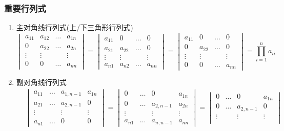 \subsubsection{重要行列式}
\begin{enumerate}
\item 主对角线行列式(上/下三角形行列式)
\begin{equation*}
\begin{vmatrix}
a_{11} & a_{12} & \dots & a_{1n} \\
0 & a_{22} & \dots & a_{2n} \\
\vdots & \vdots & & \vdots \\
0 & 0 & \dots & a_{nn}
\end{vmatrix}=
\begin{vmatrix}
a_{11} & 0 & \dots & 0 \\
a_{21} & a_{22} & \dots & 0 \\
\vdots & \vdots & & \vdots \\
a_{n1} & a_{n2} & \dots & a_{nn}
\end{vmatrix}=
\begin{vmatrix}
a_{11} & 0 & \dots & 0 \\
0 & a_{22} & \dots & 0 \\
\vdots & \vdots & & \vdots \\
0 & 0 & \dots & a_{nn}
\end{vmatrix}=
\prod_{i=1}^{n}a_{ii}
\end{equation*}
\item 副对角线行列式
\begin{equation*}
\begin{aligned}
& \begin{vmatrix}
a_{11} & \dots & a_{1,n-1} & a_{1n} \\
a_{21} & \dots & a_{2,n-1} & 0 \\
\vdots & & \vdots & \vdots \\
a_{n1} & \dots & 0 & 0
\end{vmatrix}=
\begin{vmatrix}
0 & \dots & 0 & a_{1n} \\
0 & \dots & a_{2,n-1} & a_{2n} \\
\vdots & & \vdots & \vdots \\
a_{n1} & \dots & a_{n,n-1} & a_{nn}
\end{vmatrix}=
\begin{vmatrix}
0 & \dots & 0 & a_{1n} \\
0 & \dots & a_{2,n-1} & 0 \\
\vdots & & \vdots & \vdots \\

\end{vmatrix}
\end{aligned}
\end{equation*}
\end{enumerate}
